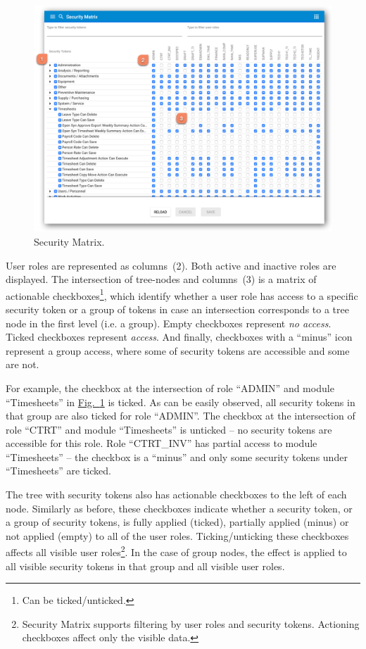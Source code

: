 \documentclass[a4paper,12pt,oneside,openright]{memoir}
\begin{document}
	\begin{figure}[h!tbp]
	\centering
	\includegraphics[width=0.9\linewidth]{images/09-security-matrix.png}
	\caption{Security Matrix.}\label{sec:03_01:fig:4}
	\end{figure}

	User roles are represented as columns~(2).
	Both active and inactive roles are displayed.
	The intersection of tree-nodes and columns~(3) is a matrix of actionable checkboxes\footnote{Can be ticked/unticked.}, which identify whether a user role has access to a specific security token or a group of tokens in case an intersection corresponds to a tree node in the first level (i.e. a group).
	Empty checkboxes represent \emph{no access}.
	Ticked checkboxes represent \emph{access}.
	And finally, checkboxes with a ``minus'' icon represent a group access, where some of security tokens are accessible and some are not.

	For example, the checkbox at the intersection of role ``ADMIN'' and module ``Timesheets'' in \hyperref[sec:03_01:fig:4]{Fig.~\ref*{sec:03_01:fig:4}} is ticked.
	As can be easily observed, all security tokens in that group are also ticked for role ``ADMIN''.
	The checkbox at the intersection of role ``CTRT'' and module ``Timesheets'' is unticked -- no security tokens are accessible for this role.
	Role ``CTRT_INV'' has partial access to module ``Timesheets'' -- the checkbox is a ``minus'' and only some security tokens under ``Timesheets'' are ticked.

	The tree with security tokens also has actionable checkboxes to the left of each node.
	Similarly as before, these checkboxes indicate whether a security token, or a group of security tokens, is fully applied (ticked), partially applied (minus) or not applied (empty) to all of the user roles.
	Ticking/unticking these checkboxes affects all visible user roles\footnote{Security Matrix supports filtering by user roles and security tokens. Actioning checkboxes affect only the visible data.}.
	In the case of group nodes, the effect is applied to all visible security tokens in that group and all visible user roles.
\end{document}
